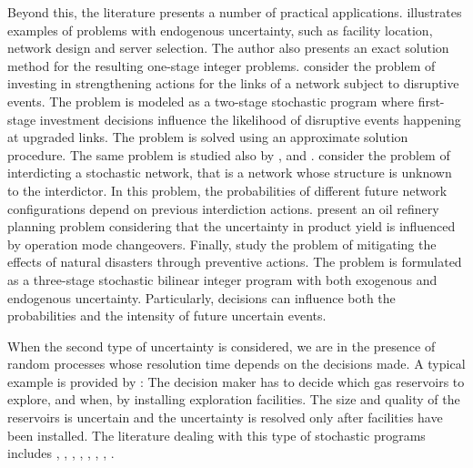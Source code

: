 \documentclass[12pt]{article}
\theoremstyle{thmstylethree}%
\begin{document}
Beyond this, the literature presents a number of practical applications.
\cite{Ahm00} illustrates examples of problems with endogenous uncertainty, such as facility location, network design and
server selection. The author also presents an exact solution method for the resulting one-stage integer problems.
\cite{VisSF04} consider the problem of investing in strengthening actions for the links of a network subject to
disruptive events. The problem is modeled as a two-stage stochastic program where first-stage investment decisions
influence the likelihood of disruptive events happening at upgraded links. The problem is solved using an approximate solution procedure. 
The same problem is studied also by
\cite{Fla10}, \cite{PeeSGV10} and \cite{LauPK14}. 
\cite{HelW05} consider the problem of interdicting a stochastic network, that is a network whose structure is unknown to the interdictor. 
In this problem, the probabilities of different future network configurations depend on previous interdiction actions.
\cite{TonFR12} present an oil refinery planning problem considering that the uncertainty in product
yield is influenced by operation mode changeovers.  Finally, \cite{EscGMU18} study the problem of mitigating the effects of
natural disasters through preventive actions. The problem is formulated as a three-stage stochastic
bilinear integer program with both exogenous and endogenous uncertainty. Particularly, decisions can influence
both the probabilities and the intensity of future uncertain events. 

When the second type of uncertainty is considered, we are in the presence of random processes whose resolution time depends on the decisions made. 
A typical example is provided by \cite{GoeG04}: The decision maker has to decide which gas reservoirs to explore, and when, by installing exploration facilities. The size and quality of the reservoirs is uncertain and the uncertainty is resolved only after facilities have been installed. The literature dealing with this type of stochastic programs includes \cite{ColM08}, \cite{TarG08}, \cite{TarGG09}, \cite{ColM10}, \cite{GupG11}, \cite{MerV11}, \cite{TarGG13}, \cite{ApaG16}.
\end{document}
